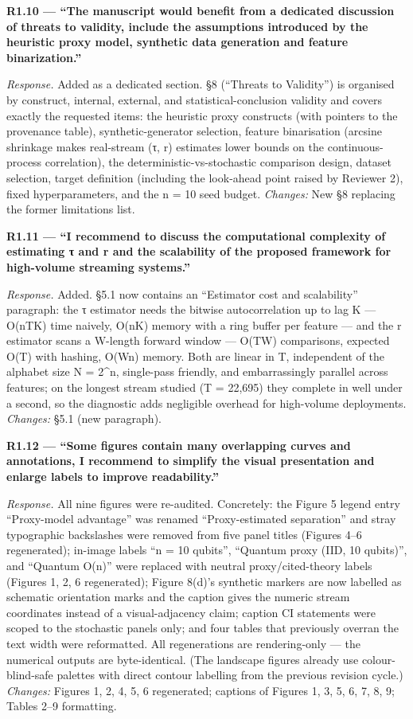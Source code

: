\documentclass[
  11pt,
]{article}
\begin{document}
\textbf{R1.10 --- ``The manuscript would benefit from a dedicated
discussion of threats to validity, include the assumptions introduced by
the heuristic proxy model, synthetic data generation and feature
binarization.''}

\emph{Response.} Added as a dedicated section. §8 (``Threats to
Validity'') is organised by construct, internal, external, and
statistical-conclusion validity and covers exactly the requested items:
the heuristic proxy constructs (with pointers to the provenance table),
synthetic-generator selection, feature binarisation (arcsine shrinkage
makes real-stream (τ, r) estimates lower bounds on the
continuous-process correlation), the deterministic-vs-stochastic
comparison design, dataset selection, target definition (including the
look-ahead point raised by Reviewer 2), fixed hyperparameters, and the n
= 10 seed budget. \emph{Changes:} New §8 replacing the former
limitations list.

\textbf{R1.11 --- ``I recommend to discuss the computational complexity
of estimating τ and r and the scalability of the proposed framework for
high-volume streaming systems.''}

\emph{Response.} Added. §5.1 now contains an ``Estimator cost and
scalability'' paragraph: the τ estimator needs the bitwise
autocorrelation up to lag K --- O(nTK) time naively, O(nK) memory with a
ring buffer per feature --- and the r estimator scans a W-length forward
window --- O(TW) comparisons, expected O(T) with hashing, O(Wn) memory.
Both are linear in T, independent of the alphabet size N = 2\^{}n,
single-pass friendly, and embarrassingly parallel across features; on
the longest stream studied (T = 22,695) they complete in well under a
second, so the diagnostic adds negligible overhead for high-volume
deployments. \emph{Changes:} §5.1 (new paragraph).

\textbf{R1.12 --- ``Some figures contain many overlapping curves and
annotations, I recommend to simplify the visual presentation and enlarge
labels to improve readability.''}

\emph{Response.} All nine figures were re-audited. Concretely: the
Figure 5 legend entry ``Proxy-model advantage'' was renamed
``Proxy-estimated separation'' and stray typographic backslashes were
removed from five panel titles (Figures 4--6 regenerated); in-image
labels ``n = 10 qubits'', ``Quantum proxy (IID, 10 qubits)'', and
``Quantum O(n)'' were replaced with neutral proxy/cited-theory labels
(Figures 1, 2, 6 regenerated); Figure 8(d)'s synthetic markers are now
labelled as schematic orientation marks and the caption gives the
numeric stream coordinates instead of a visual-adjacency claim; caption
CI statements were scoped to the stochastic panels only; and four tables
that previously overran the text width were reformatted. All
regenerations are rendering-only --- the numerical outputs are
byte-identical. (The landscape figures already use colour-blind-safe
palettes with direct contour labelling from the previous revision
cycle.) \emph{Changes:} Figures 1, 2, 4, 5, 6 regenerated; captions of
Figures 1, 3, 5, 6, 7, 8, 9; Tables 2--9 formatting.
\end{document}
